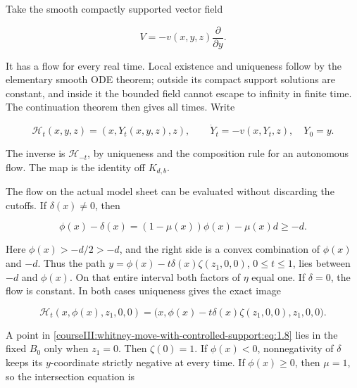 Take the smooth compactly supported vector field

\begin{equation}
V=-v(x,y,z)\frac{\partial}{\partial y}.
\label{courseIII:whitney-move-with-controlled-support:eq:1.5}
\end{equation}

It has a flow for every real time. Local existence and uniqueness follow by the elementary smooth ODE theorem; outside its compact support solutions are constant, and inside it the bounded field cannot escape to infinity in finite time. The continuation theorem then gives all times. Write

\begin{equation}
\mathcal H_t(x,y,z)=(x,Y_t(x,y,z),z),\qquad
\dot Y_t=-v(x,Y_t,z),\quad Y_0=y.
\label{courseIII:whitney-move-with-controlled-support:eq:1.6}
\end{equation}

The inverse is \(\mathcal H_{-t}\), by uniqueness and the composition rule for an autonomous flow. The map is the identity off \(K_{d,b}\).

The flow on the actual model sheet can be evaluated without discarding the cutoffs. If \(\delta(x)\ne0\), then

\begin{equation}
\phi(x)-\delta(x)
=(1-\mu(x))\phi(x)-\mu(x)d\geq-d.
\label{courseIII:whitney-move-with-controlled-support:eq:1.7}
\end{equation}

Here \(\phi(x)>-d/2>-d\), and the right side is a convex combination of \(\phi(x)\) and \(-d\). Thus the path
\(y=\phi(x)-t\delta(x)\zeta(z_1,0,0)\), \(0\leq t\leq1\), lies between \(-d\) and \(\phi(x)\). On that entire interval both factors of \(\eta\) equal one. If \(\delta=0\), the flow is constant. In both cases uniqueness gives the exact image

\begin{equation}
\mathcal H_t(x,\phi(x),z_1,0,0)
=\bigl(x,\phi(x)-t\delta(x)\zeta(z_1,0,0),z_1,0,0\bigr).
\label{courseIII:whitney-move-with-controlled-support:eq:1.8}
\end{equation}

A point in \eqref{courseIII:whitney-move-with-controlled-support:eq:1.8} lies in the fixed \(B_0\) only when \(z_1=0\). Then \(\zeta(0)=1\). If \(\phi(x)<0\), nonnegativity of \(\delta\) keeps its \(y\)-coordinate strictly negative at every time. If \(\phi(x)\geq0\), then \(\mu=1\), so the intersection equation is

